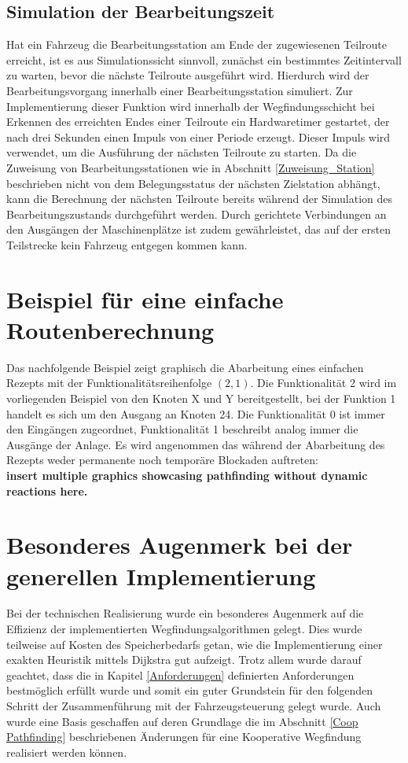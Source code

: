 		\subsection{Simulation der Bearbeitungszeit}
			\label{Simulation Station}
			Hat ein Fahrzeug die Bearbeitungsstation am Ende der zugewiesenen Teilroute erreicht, ist es aus Simulationssicht sinnvoll, zunächst ein bestimmtes Zeitintervall zu warten, bevor die nächste Teilroute ausgeführt wird. Hierdurch wird der Bearbeitungsvorgang innerhalb einer Bearbeitungsstation simuliert. Zur Implementierung dieser Funktion wird innerhalb der Wegfindungsschicht bei Erkennen des erreichten Endes einer Teilroute ein Hardwaretimer gestartet, der nach drei Sekunden einen Impuls von einer Periode erzeugt. Dieser Impuls wird verwendet, um die Ausführung der nächsten Teilroute zu starten. Da die Zuweisung von Bearbeitungsstationen wie in Abschnitt \ref{Zuweisung_Station} beschrieben nicht von dem Belegungsstatus der nächsten Zielstation abhängt, kann die Berechnung der nächsten Teilroute bereits während der Simulation des Bearbeitungszustands durchgeführt werden. Durch gerichtete Verbindungen an den Ausgängen der Maschinenplätze ist zudem gewährleistet, das auf der ersten Teilstrecke kein Fahrzeug entgegen kommen kann.
	
		
	\section{Beispiel für eine einfache Routenberechnung}
	
		Das nachfolgende Beispiel zeigt graphisch die Abarbeitung eines einfachen Rezepts mit der Funktionalitätsreihenfolge $(2,1)$. Die Funktionalität 2 wird im vorliegenden Beispiel von den Knoten X und Y bereitgestellt, bei der Funktion 1 handelt es sich um den Ausgang an Knoten 24. Die Funktionalität 0 ist immer den Eingängen zugeordnet, Funktionalität 1 beschreibt analog immer die Ausgänge der Anlage. Es wird angenommen das während der Abarbeitung des Rezepts weder permanente noch temporäre Blockaden auftreten:\\
		\textbf{insert multiple graphics showcasing pathfinding without dynamic reactions here.}
		
	\section{Besonderes Augenmerk bei der generellen Implementierung}
		Bei der technischen Realisierung wurde ein besonderes Augenmerk auf die Effizienz der implementierten Wegfindungsalgorithmen gelegt. Dies wurde teilweise auf Kosten des Speicherbedarfs getan, wie die Implementierung einer exakten Heuristik mittels Dijkstra gut aufzeigt. Trotz allem wurde darauf geachtet, dass die in Kapitel \ref{Anforderungen} definierten Anforderungen bestmöglich erfüllt wurde und somit ein guter Grundstein für den folgenden Schritt der Zusammenführung mit der Fahrzeugsteuerung gelegt wurde. Auch wurde eine Basis geschaffen auf deren Grundlage die im Abschnitt \ref{Coop Pathfinding} beschriebenen Änderungen für eine Kooperative Wegfindung realisiert werden können.